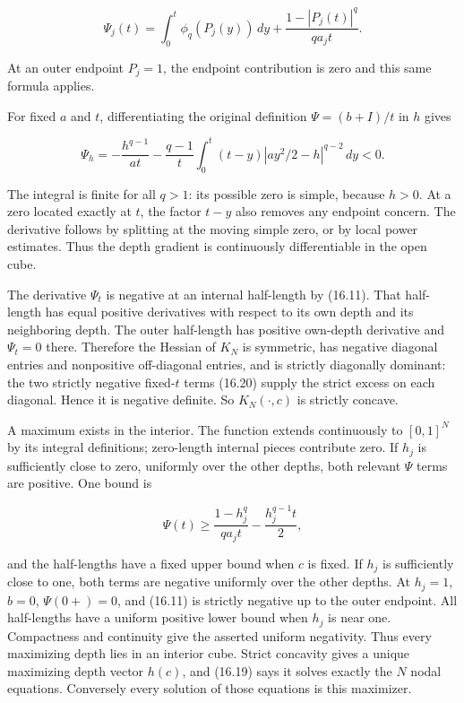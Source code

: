 \documentclass[11pt]{article}
\begin{document}
\[
\Psi_j(t)=\int_0^t\phi_q(P_j(y))\,dy+
\frac{1-|P_j(t)|^q}{q a_jt}.
\]

At an outer endpoint \(P_j=1\), the endpoint contribution is zero and
this same formula applies.

For fixed \(a\) and \(t\), differentiating the original definition
\(\Psi=(b+I)/t\) in \(h\) gives

\[
\Psi_h=-\frac{h^{q-1}}{at}
-\frac{q-1}{t}\int_0^t(t-y)|ay^2/2-h|^{q-2}\,dy<0.
\tag{16.20}
\]

The integral is finite for all \(q>1\): its possible zero is simple,
because \(h>0\). At a zero located exactly at \(t\), the factor \(t-y\)
also removes any endpoint concern. The derivative follows by splitting
at the moving simple zero, or by local power estimates. Thus the depth
gradient is continuously differentiable in the open cube.

The derivative \(\Psi_t\) is negative at an internal half-length by
(16.11). That half-length has equal positive derivatives with respect to
its own depth and its neighboring depth. The outer half-length has
positive own-depth derivative and \(\Psi_t=0\) there. Therefore the
Hessian of \(K_N\) is symmetric, has negative diagonal entries and
nonpositive off-diagonal entries, and is strictly diagonally dominant:
the two strictly negative fixed-\(t\) terms (16.20) supply the strict
excess on each diagonal. Hence it is negative definite. So
\(K_N(\cdot,c)\) is strictly concave.

A maximum exists in the interior. The function extends continuously to
\([0,1]^N\) by its integral definitions; zero-length internal pieces
contribute zero. If \(h_j\) is sufficiently close to zero, uniformly
over the other depths, both relevant \(\Psi\) terms are positive. One
bound is

\[
\Psi(t)\ge\frac{1-h_j^q}{q a_jt}-\frac{h_j^{q-1}t}{2},
\]

and the half-lengths have a fixed upper bound when \(c\) is fixed. If
\(h_j\) is sufficiently close to one, both terms are negative uniformly
over the other depths. At \(h_j=1\), \(b=0\), \(\Psi(0+)=0\), and
(16.11) is strictly negative up to the outer endpoint. All half-lengths
have a uniform positive lower bound when \(h_j\) is near one.
Compactness and continuity give the asserted uniform negativity. Thus
every maximizing depth lies in an interior cube. Strict concavity gives
a unique maximizing depth vector \(h(c)\), and (16.19) says it solves
exactly the \(N\) nodal equations. Conversely every solution of those
equations is this maximizer.
\end{document}
